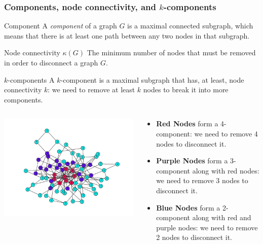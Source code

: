 \documentclass[ignorenonframetext,red,8pt,notes=hide]{beamer}
\begin{document}
\begin{frame}
\frametitle{Components, node connectivity, and $k$-components}

\begin{block}{Component}
A \emph{component} of a graph $G$ is a maximal connected subgraph, which means that there is at least one path between any two nodes in that subgraph.
\end{block}

\begin{block}{Node connectivity $\kappa(G)$}
The minimum number of nodes that must be removed in order to disconnect a graph $G$.
\end{block}

\begin{block}{$k$-components}
A $k$-component is a maximal subgraph that has, at least, node connectivity $k$: we need to remove at least $k$ nodes to break it into more components. 
\end{block}

\vspace{-0.5cm}

\begin{columns}[c]
\begin{column}{0.4\textwidth}
\begin{center}
\includegraphics[scale=0.25]{img/knum_colors}
\end{center}
\end{column}

\begin{column}{0.6\textwidth}
\begin{itemize}
\item \textbf{Red Nodes} form a 4-component: we need to remove 4 nodes to disconnect it.
\item \textbf{Purple Nodes} form a 3-component along with red nodes: we need to remove 3 nodes to disconnect it.
\item \textbf{Blue Nodes} form a 2-component along with red and purple nodes: we need to remove 2 nodes to disconnect it. 
\end{itemize}
\end{column}
\end{columns}

\end{frame}
\end{document}
